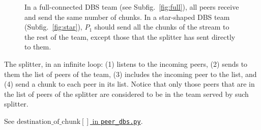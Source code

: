 \begin{figure}%
  \centering
  \qquad
  \caption{In a full-connected DBS team (see Subfig.~\ref{fig:full}),
    all peers receive and send the same number of chunks. In a
    star-shaped DBS team (Subfig.~\ref{fig:star}), $P_1$ should send
    all the chunks of the stream to the rest of the team, except those
    that the splitter has sent directly to them.}
  \label{fig:connections}
\end{figure}


The splitter, in an infinite loop: (1) listens to the incoming peers,
(2) sends to them the list of peers of the team, (3) includes the
incoming peer to the list, and (4) send a chunk to each peer in its
list. Notice that only those peers that are in the list of peers of
the splitter are considered to be in the team served by such splitter.

\begin{notex}
  See \href{https://github.com/P2PSP/simulator/blob/f0c73be1817e7d3b816cc61cd2c8e59b17f9a0e6/src/core/splitter_dbs.py#L296}{$\text{destination\_of\_chunk}[]$ in \texttt{peer\_dbs.py}}.
\end{notex}
